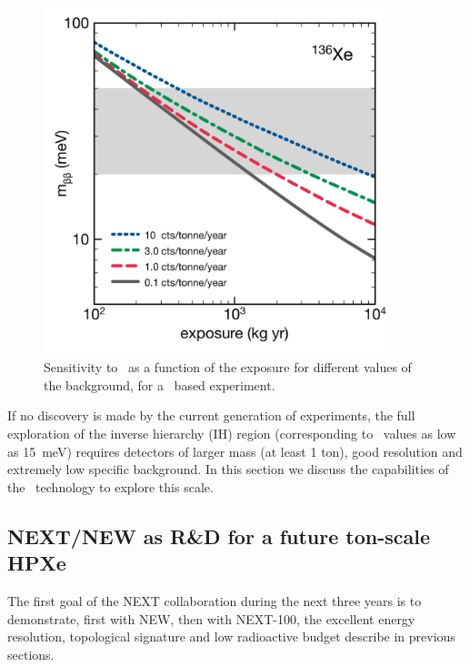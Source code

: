 

\begin{figure}
\centering
\includegraphics[width=0.90\textwidth]{img2/FutureXe136.pdf}
\caption{\small Sensitivity to \mbb\ as a function of the exposure for different values of the background, for a \XE\ based experiment.} \label{fig.Xe}
\end{figure}

If no discovery is made by the current generation of experiments, the full exploration of the inverse hierarchy (IH) region (corresponding to \mbb\ values as low as 15~meV) requires detectors of larger mass (at least 1 ton), good resolution and extremely low specific background. In this section we discuss the capabilities of the \HPXE\ technology to explore this scale. 

\subsection{NEXT/NEW as R\&D for a future ton-scale HPXe}

The first goal of the NEXT collaboration during the next three years is to demonstrate, first with NEW, then with NEXT-100, the excellent energy resolution, topological signature and low radioactive budget describe in previous sections. 

